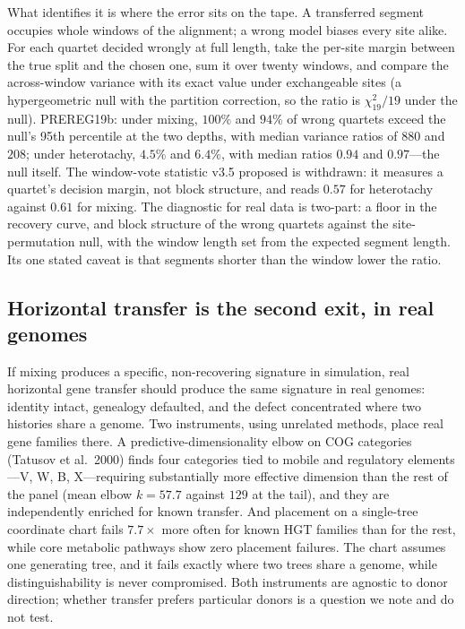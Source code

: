 \documentclass[11pt]{article}
\begin{document}
What identifies it is where the error sits on the tape. A transferred segment occupies whole windows of the alignment; a wrong model biases every site alike. For each quartet decided wrongly at full length, take the per-site margin between the true split and the chosen one, sum it over twenty windows, and compare the across-window variance with its exact value under exchangeable sites (a hypergeometric null with the partition correction, so the ratio is $\chi^2_{19}/19$ under the null). PREREG19b: under mixing, $100\%$ and $94\%$ of wrong quartets exceed the null's 95th percentile at the two depths, with median variance ratios of $880$ and $208$; under heterotachy, $4.5\%$ and $6.4\%$, with median ratios $0.94$ and $0.97$---the null itself. The window-vote statistic v3.5 proposed is withdrawn: it measures a quartet's decision margin, not block structure, and reads $0.57$ for heterotachy against $0.61$ for mixing. The diagnostic for real data is two-part: a floor in the recovery curve, and block structure of the wrong quartets against the site-permutation null, with the window length set from the expected segment length. Its one stated caveat is that segments shorter than the window lower the ratio.

\subsection{Horizontal transfer is the second exit, in real genomes}

If mixing produces a specific, non-recovering signature in simulation, real horizontal gene transfer should produce the same signature in real genomes: identity intact, genealogy defaulted, and the defect concentrated where two histories share a genome. Two instruments, using unrelated methods, place real gene families there. A predictive-dimensionality elbow on COG categories (Tatusov et al.\ 2000) finds four categories tied to mobile and regulatory elements---V, W, B, X---requiring substantially more effective dimension than the rest of the panel (mean elbow $k=57.7$ against $129$ at the tail), and they are independently enriched for known transfer. And placement on a single-tree coordinate chart fails $7.7\times$ more often for known HGT families than for the rest, while core metabolic pathways show zero placement failures. The chart assumes one generating tree, and it fails exactly where two trees share a genome, while distinguishability is never compromised. Both instruments are agnostic to donor direction; whether transfer prefers particular donors is a question we note and do not test.
\end{document}
